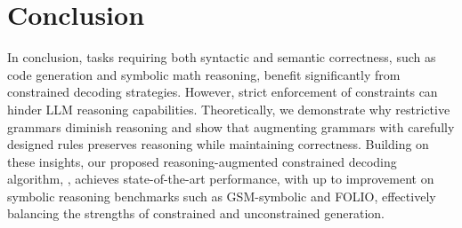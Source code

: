\vspace{-5pt}
\section{Conclusion}
In conclusion, tasks requiring both syntactic and semantic correctness, such as code generation and symbolic math reasoning, benefit significantly from constrained decoding strategies. However, strict enforcement of constraints can hinder LLM reasoning capabilities. Theoretically, we demonstrate why restrictive grammars diminish reasoning and show that augmenting grammars with carefully designed rules preserves reasoning while maintaining correctness. Building on these insights, our proposed reasoning-augmented constrained decoding algorithm, \Tool{}, achieves state-of-the-art performance, with up to \upto{} improvement on symbolic reasoning benchmarks such as GSM-symbolic and FOLIO, effectively balancing the strengths of constrained and unconstrained generation.